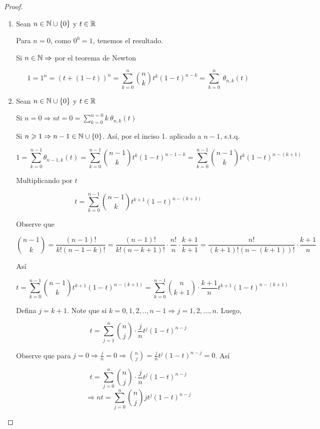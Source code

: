 \begin{proof}
    \begin{enumerate}
        \item  Sean $n \in \mathbb{N} \cup \{ 0 \}$ y $t \in \mathbb{R}$

        Para $n= 0$, como $0^0 = 1$, tenemos el resultado.

        Si $n \in \mathbb{N} \Rightarrow$ por el teorema de Newton

        $$1 = 1^n = {(t+(1-t))}^{n} = \sum\limits_{k=0}^{n} \binom{n}{k} {t}^{k}{(1-t)}^{n-k} = \sum\limits_{k=0}^{n} \: {\theta}_{n,k} (t)$$

        \item   Sean $n \in \mathbb{N} \cup \{ 0 \}$ y $t \in \mathbb{R}$

        Si $n = 0 \Rightarrow nt = 0 = \sum\limits_{k=0}^{n=0} k \: {\theta}_{n,k} (t)$

        Si $n  \geqslant 1  \Rightarrow n - 1 \in \mathbb{N} \cup \{0\}$. Así, por el inciso 1. aplicado a $n-1$, s.t.q.

        $$1 = \sum\limits_{k=0}^{n-1} {\theta}_{n-1,k} (t) = \sum\limits_{k=0}^{n-1}  \binom{n-1}{k} {t}^{k}{(1-t)}^{n-1-k} =  \sum\limits_{k=0}^{n-1}  \binom{n-1}{k} {t}^{k}{(1-t)}^{n-(k+1)}$$

        Multiplicando por $t$

        $$t = \sum\limits_{k=0}^{n-1}  \binom{n-1}{k} {t}^{k+1}{(1-t)}^{n-(k+1)}$$

        Observe que 

        $$\binom{n-1}{k} = \frac{(n-1)!}{k!(n-1-k)!} = \frac{(n-1)!}{k!(n-k+1)!} \cdot \frac{n!}{n} \cdot \frac{k+1}{k+1} = \frac{n!}{(k+1)!(n-(k+1))!} \cdot \frac{k+1}{n}$$

        Así 

        $$t = \sum\limits_{k=0}^{n-1}  \binom{n-1}{k} {t}^{k+1}{(1-t)}^{n-(k+1)} = \sum\limits_{k=0}^{n-1}  \binom{n}{k+1} \cdot \frac{k+1}{n} {t}^{k+1}{(1-t)}^{n-(k+1)}$$

        Defina $j = k+1$. Note que si $k = 0,1,2,..,n-1 \Rightarrow j = 1, 2, ..., n$. Luego,

        $$t = \sum\limits_{j=1}^{n}  \binom{n}{j} \cdot \frac{j}{n} {t}^{j}{(1-t)}^{n-j}$$

        Observe que para $j = 0 \Rightarrow \frac{j}{n} = 0 \Rightarrow \binom{n}{j} = \frac{j}{n}{t}^{j}{(1-t)}^{n-j} = 0$. Así

        $$t=\sum\limits_{j=0}^{n}  \binom{n}{j} \cdot \frac{j}{n} {t}^{j}{(1-t)}^{n-j} $$
        $$\Rightarrow nt=\sum\limits_{j=0}^{n}  \binom{n}{j} j {t}^{j}{(1-t)}^{n-j}$$


\end{enumerate}
\end{proof}
